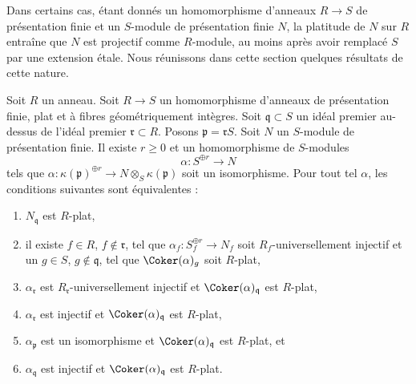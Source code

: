 \noindent
Dans certains cas, étant donnés un homomorphisme d'anneaux $R \to S$ de présentation finie et
un $S$-module de présentation finie $N$, la platitude de $N$ sur $R$ entraîne
que $N$ est projectif comme $R$-module, au moins après avoir remplacé $S$
par une extension \'etale. Nous réunissons dans cette section quelques résultats
de cette nature.

\begin{lemma}
\label{lemma-induction-step-fp}
Soit $R$ un anneau. Soit $R \to S$ un homomorphisme d'anneaux de présentation finie,
plat et à fibres géométriquement intègres. Soit
$\mathfrak q \subset S$ un idéal premier au-dessus de l'idéal premier
$\mathfrak r \subset R$. Posons $\mathfrak p = \mathfrak r S$.
Soit $N$ un $S$-module de présentation finie.
Il existe $r \geq 0$ et un homomorphisme de $S$-modules
$$
\alpha : S^{\oplus r} \longrightarrow N
$$
tels que
$\alpha : \kappa(\mathfrak p)^{\oplus r} \to N \otimes_S \kappa(\mathfrak p)$
soit un isomorphisme. Pour tout tel $\alpha$, les conditions suivantes sont équivalentes :
\begin{enumerate}
\item $N_{\mathfrak q}$ est $R$-plat,
\item il existe $f \in R$, $f \not \in \mathfrak r$, tel que
$\alpha_f : S_f^{\oplus r} \to N_f$ soit $R_f$-universellement injectif et
un $g \in S$, $g \not \in \mathfrak q$, tel que $\Coker(\alpha)_g$
soit $R$-plat,
\item $\alpha_{\mathfrak r}$ est $R_{\mathfrak r}$-universellement injectif et
$\Coker(\alpha)_{\mathfrak q}$ est $R$-plat,
\item $\alpha_{\mathfrak r}$ est injectif et
$\Coker(\alpha)_{\mathfrak q}$ est $R$-plat,
\item $\alpha_{\mathfrak p}$ est un isomorphisme et
$\Coker(\alpha)_{\mathfrak q}$ est $R$-plat, et
\item $\alpha_{\mathfrak q}$ est injectif et
$\Coker(\alpha)_{\mathfrak q}$ est $R$-plat.
\end{enumerate}
\end{lemma}

